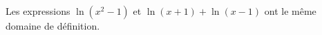 Les expressions $\ln(x^2-1)$ et $\ln(x+1)+\ln(x-1)$ ont le même domaine de définition.

\begin{reponses}
\end{reponses}


